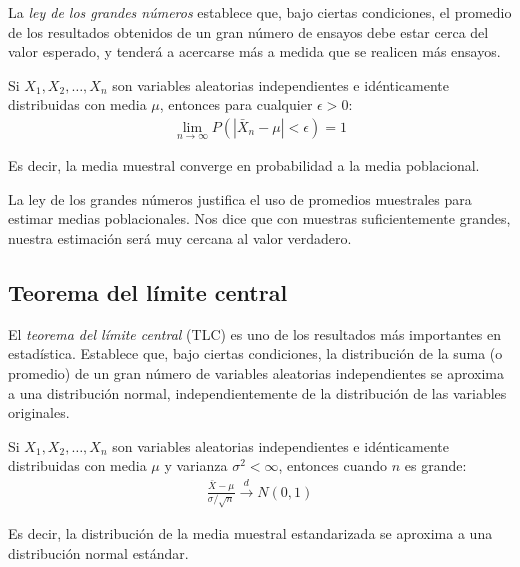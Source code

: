 La \emph{ley de los grandes números} establece que, bajo ciertas condiciones, el promedio de los resultados obtenidos de un gran número de ensayos debe estar cerca del valor esperado, y tenderá a acercarse más a medida que se realicen más ensayos.

\begin{teorema}
	\label{teo:5.1.1}
	Si $X_1, X_2, \ldots, X_n$ son variables aleatorias independientes e idénticamente distribuidas con media $\mu$, entonces para cualquier $\epsilon > 0$:
	\begin{align}
		\lim_{n \to \infty} P(|\bar{X}_n - \mu| < \epsilon) = 1
	\end{align}

	Es decir, la media muestral converge en probabilidad a la media poblacional.
\end{teorema}

\begin{observacion}
	La ley de los grandes números justifica el uso de promedios muestrales para estimar medias poblacionales. Nos dice que con muestras suficientemente grandes, nuestra estimación será muy cercana al valor verdadero.
\end{observacion}

\subsection*{Teorema del límite central}

El \emph{teorema del límite central} (TLC) es uno de los resultados más importantes en estadística. Establece que, bajo ciertas condiciones, la distribución de la suma (o promedio) de un gran número de variables aleatorias independientes se aproxima a una distribución normal, independientemente de la distribución de las variables originales.

\begin{teorema}
	\label{teo:5.1.2}
	Si $X_1, X_2, \ldots, X_n$ son variables aleatorias independientes e idénticamente distribuidas con media $\mu$ y varianza $\sigma^2 < \infty$, entonces cuando $n$ es grande:
	\begin{align}
		\frac{\bar{X} - \mu}{\sigma/\sqrt{n}} \xrightarrow{d} N(0,1)
	\end{align}

	Es decir, la distribución de la media muestral estandarizada se aproxima a una distribución normal estándar.
\end{teorema}

